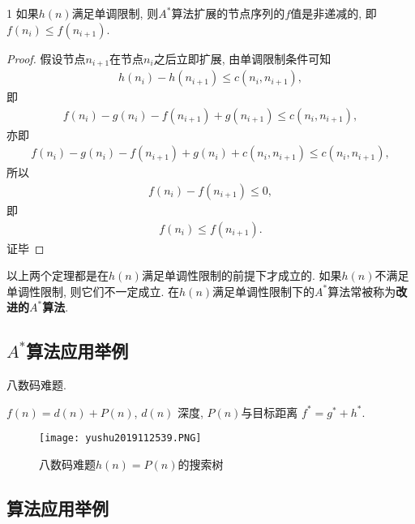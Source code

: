 \begin{mythm}{}{1}
如果$h(n)$满足单调限制, 则$A^*$算法扩展的节点序列的$f$值是非递减的, 即$f(n_i)\leq f(n_{i+1} )$.
\end{mythm}
\begin{proof}
假设节点$n_{i+1}$在节点$n_i$之后立即扩展, 由单调限制条件可知
\begin{align}
  h(n_i)-h(n_{i+1} )\leq c(n_i , n_{i+1}),
\end{align}
即
\begin{align}
  f(n_i)-g(n_i )-f(n_{i+1} )+g(n_{i+1} )\leq c(n_i , n_{i+1} ),
\end{align}
亦即
\begin{align}
  f(n_i)-g(n_i )-f(n_{i+1} )+g(n_i )+c(n_i , n_{i+1} )\leq c(n_i , n_{i+1} ),
\end{align}
所以
\begin{align}
  f(n_i)-f(n_{i+1} )\leq 0,
\end{align}
即
\begin{align}
  f(n_i)\leq f(n_{i+1}).
\end{align}
证毕
\end{proof}
\begin{remark}
  以上两个定理都是在$h(n)$满足单调性限制的前提下才成立的. 如果$h(n)$不满足单调性限制, 则它们不一定成立.
  在$h(n)$满足单调性限制下的$A^*$算法常被称为\textbf{改进的$A^*$算法}.
\end{remark}
\subsection{$A^*$算法应用举例}
\begin{example}
  八数码难题.
\end{example}
$f(n)=d(n)+P(n)$, $d(n)$ 深度, $P(n)$与目标距离 $f^*=g^*+h^*$.
\begin{figure}[H]
\centering
\texttt{[image: yushu2019112539.PNG]}
\caption{八数码难题$h(n)=P(n)$的搜索树}
\label{AI32fig39}
\end{figure}
\subsection{算法应用举例}
